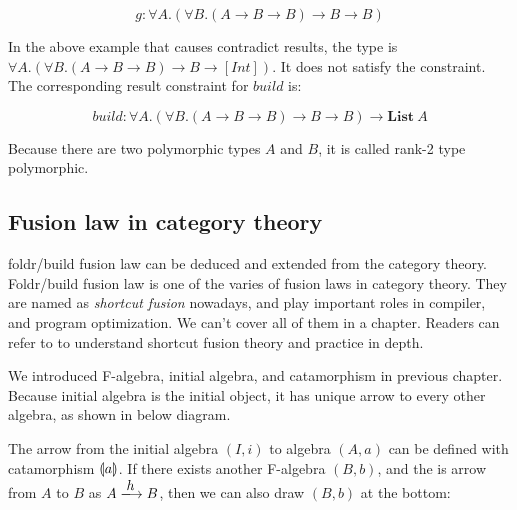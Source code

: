 \documentclass{article}
\begin{document}
\[
g : \forall A. (\forall B. (A \to B \to B) \to B \to B)
\]

In the above example that causes contradict results, the type is $\forall A. (\forall B. (A \to B \to B) \to B \to [Int])$. It does not satisfy the constraint. The corresponding result constraint for $build$ is:

\[
build : \forall A. (\forall B. (A \to B \to B) \to B \to B) \to \mathbf{List}\ A
\]

Because there are two polymorphic types $A$ and $B$, it is called rank-2 type polymorphic.

\subsection{Fusion law in category theory}
foldr/build fusion law can be deduced and extended from the category theory. Foldr/build fusion law is one of the varies of fusion laws in category theory. They are named as {\em shortcut fusion} nowadays, and play important roles in compiler, and program optimization. We can't cover all of them in a chapter. Readers can refer to \cite{Hinze-Harper-James-2010} to understand shortcut fusion theory and practice in depth.

We introduced F-algebra, initial algebra, and catamorphism in previous chapter. Because initial algebra is the initial object, it has unique arrow to every other algebra, as shown in below diagram.

\begin{center}
\end{center}

The arrow from the initial algebra $(I, i)$ to algebra $(A, a)$ can be defined with catamorphism $\llparenthesis a \rrparenthesis$. If there exists another F-algebra $(B, b)$, and the is arrow from $A$ to $B$ as $A \arrowto{h} B$, then we can also draw $(B, b)$ at the bottom:
\end{document}
